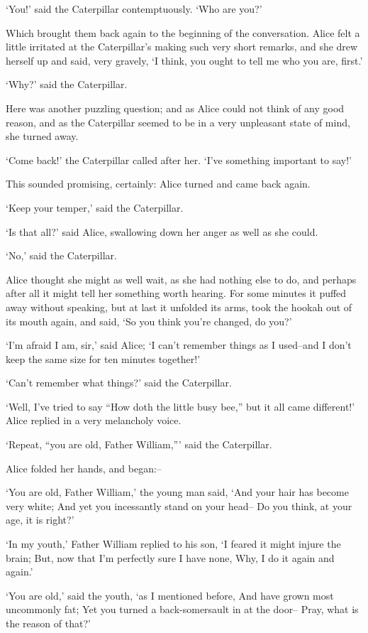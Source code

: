 \documentclass[statementpaper,twoside,openany]{memoir}
\begin{document}
`You!' said the Caterpillar contemptuously. `Who are you?'

Which brought them back again to the beginning of the conversation. Alice felt a little irritated at the Caterpillar's making such very short remarks, and she drew herself up and said, very gravely, `I think, you ought to tell me who you are, first.'

`Why?' said the Caterpillar.

Here was another puzzling question; and as Alice could not think of any good reason, and as the Caterpillar seemed to be in a very unpleasant state of mind, she turned away.

`Come back!' the Caterpillar called after her. `I've something important to say!'

This sounded promising, certainly: Alice turned and came back again.

`Keep your temper,' said the Caterpillar.

`Is that all?' said Alice, swallowing down her anger as well as she could.

`No,' said the Caterpillar.

Alice thought she might as well wait, as she had nothing else to do, and perhaps after all it might tell her something worth hearing. For some minutes it puffed away without speaking, but at last it unfolded its arms, took the hookah out of its mouth again, and said, `So you think you're changed, do you?'

`I'm afraid I am, sir,' said Alice; `I can't remember things as I used--and I don't keep the same size for ten minutes together!'

`Can't remember what things?' said the Caterpillar.

`Well, I've tried to say ``How doth the little busy bee,'' but it all came different!' Alice replied in a very melancholy voice.

`Repeat, ``you are old, Father William,''' said the Caterpillar.

Alice folded her hands, and began:--

`You are old, Father William,' the young man said, `And your hair has become very white; And yet you incessantly stand on your head-- Do you think, at your age, it is right?'

`In my youth,' Father William replied to his son, `I feared it might injure the brain; But, now that I'm perfectly sure I have none, Why, I do it again and again.'

`You are old,' said the youth, `as I mentioned before, And have grown most uncommonly fat; Yet you turned a back-somersault in at the door-- Pray, what is the reason of that?'
\end{document}
